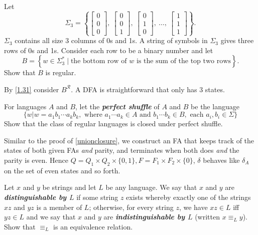 \begin{exercise}
  Let
  \[
    \Sigma_3 = \left\{
    \begin{bmatrix}
      0 \\ 0 \\ 0
    \end{bmatrix},\
    \begin{bmatrix}
      0 \\ 0 \\ 1
    \end{bmatrix},\
    \begin{bmatrix}
      0 \\ 1 \\ 0
    \end{bmatrix},\
    \dots,\
    \begin{bmatrix}
      1 \\ 1 \\ 1
    \end{bmatrix}
    \right\}.
  \]
  \noindent
  $\Sigma_3$ contains all size 3 columns of 0s and 1s. A string of symbols in $\Sigma_3$ gives three rows of 0s and 1s. Consider each row to be a binary number and let
  \[
    B = \left\{ w \in \Sigma_3^* \mid \text{the bottom row of } w \text{ is the sum of the top two rows} \right\}.
  \]
  \noindent
  Show that $B$ is regular.
\end{exercise}

By \ref{1.31} consider $B^{\mathcal{R}}$. A DFA is straightforward that only has 3 states.

\setcounter{exercise}{40}

\begin{exercise}
  For languages $A$ and $B$, let the \textbf{\textit{perfect shuffle}} of $A$ and $B$ be the language
  \[
    \{w|w=a_1b_1\cdots a_kb_k,\text{ where }a_1\cdots a_k\in A\text{ and }b_1\cdots b_k\in B,\text{ each }a_i,b_i\in \Sigma\}
  \]
  Show that the class of regular languages is closed under perfect shuffle.
\end{exercise}

Similar to the proof of \ref{unionclosure}, we construct an FA that keeps track of the states of both given FAs \textit{and} parity, and terminates when both does \textit{and} the parity is even. Hence $Q=Q_1\times Q_2\times\{0,1\}, F=F_1\times F_2\times \{0\}$, $\delta$ behaves like $\delta_A$ on the set of even states and so forth.

\setcounter{exercise}{50}

\begin{exercise}
  Let $x$ and $y$ be strings and let $L$ be any language. We say that $x$ and $y$ are \textbf{\textit{distinguishable by $L$}} if some string $z$ exists whereby exactly one of the strings $xz$ and $yz$ is a member of $L$; otherwise, for every string $z$, we have $xz \in L$ iff $yz \in L$ and we say that $x$ and $y$ are \textbf{\textit{indistinguishable by $L$}} (written $x \equiv_L y$). Show that $\equiv_L$ is an equivalence relation.
\end{exercise}

